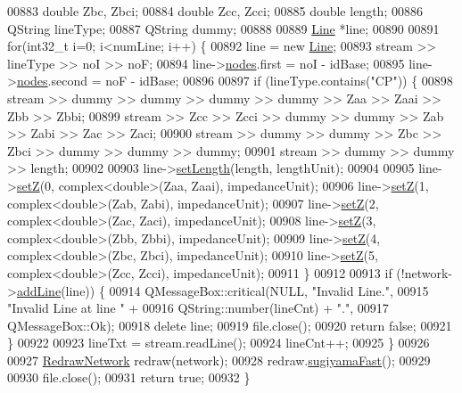 \begin{DoxyCode}
00883   \textcolor{keywordtype}{double} Zbc, Zbci;
00884   \textcolor{keywordtype}{double} Zcc, Zcci;
00885   \textcolor{keywordtype}{double} length;
00886   QString lineType;
00887   QString dummy;
00888 
00889   \hyperlink{class_line}{Line} *line;
00890 
00891   \textcolor{keywordflow}{for}(int32\_t i=0; i<numLine; i++) \{
00892     line = \textcolor{keyword}{new} \hyperlink{class_line}{Line};
00893     stream >> lineType >> noI >> noF;
00894     line->\hyperlink{class_line_afd17c40d656e6a8d677cb22df5f0c70b}{nodes}.first = noI - idBase;
00895     line->\hyperlink{class_line_afd17c40d656e6a8d677cb22df5f0c70b}{nodes}.second = noF - idBase;
00896 
00897     \textcolor{keywordflow}{if} (lineType.contains(\textcolor{stringliteral}{"CP"})) \{
00898       stream >> dummy >> dummy >> dummy >> dummy >> Zaa >> Zaai >> Zbb >> Zbbi;
00899       stream >> Zcc >> Zcci >> dummy >> dummy >> Zab >> Zabi >> Zac >> Zaci;
00900       stream >> dummy >> dummy >> Zbc >> Zbci >> dummy >> dummy >> dummy;
00901       stream >> dummy >> dummy >> length;
00902 
00903       line->\hyperlink{group___models_ga950d0b8f5d167eda430c65ca7adadbb0}{setLength}(length, lengthUnit);
00904 
00905       line->\hyperlink{group___models_ga409df7d11f5c5d594a13fb2f74b3b9e0}{setZ}(0, complex<double>(Zaa, Zaai), impedanceUnit);
00906       line->\hyperlink{group___models_ga409df7d11f5c5d594a13fb2f74b3b9e0}{setZ}(1, complex<double>(Zab, Zabi), impedanceUnit);
00907       line->\hyperlink{group___models_ga409df7d11f5c5d594a13fb2f74b3b9e0}{setZ}(2, complex<double>(Zac, Zaci), impedanceUnit);
00908       line->\hyperlink{group___models_ga409df7d11f5c5d594a13fb2f74b3b9e0}{setZ}(3, complex<double>(Zbb, Zbbi), impedanceUnit);
00909       line->\hyperlink{group___models_ga409df7d11f5c5d594a13fb2f74b3b9e0}{setZ}(4, complex<double>(Zbc, Zbci), impedanceUnit);
00910       line->\hyperlink{group___models_ga409df7d11f5c5d594a13fb2f74b3b9e0}{setZ}(5, complex<double>(Zcc, Zcci), impedanceUnit);
00911     \}
00912 
00913     \textcolor{keywordflow}{if} (!network->\hyperlink{group___graphics_gae02945131494987b3ff9b59b627719b4}{addLine}(line)) \{
00914       QMessageBox::critical(NULL, \textcolor{stringliteral}{"Invalid Line."},
00915                             \textcolor{stringliteral}{"Invalid Line at line "} +
00916                             QString::number(lineCnt) + \textcolor{stringliteral}{"."},
00917                             QMessageBox::Ok);
00918       \textcolor{keyword}{delete} line;
00919       file.close();
00920       \textcolor{keywordflow}{return} \textcolor{keyword}{false};
00921     \}
00922 
00923     lineTxt = stream.readLine();
00924     lineCnt++;
00925   \}
00926 
00927   \hyperlink{class_redraw_network}{RedrawNetwork} redraw(network);
00928   redraw.\hyperlink{class_redraw_network_a94d53ddf8ee00c4ef6d56bb988333103}{sugiyamaFast}();
00929 
00930   file.close();
00931   \textcolor{keywordflow}{return} \textcolor{keyword}{true};
00932 \}
\end{DoxyCode}

